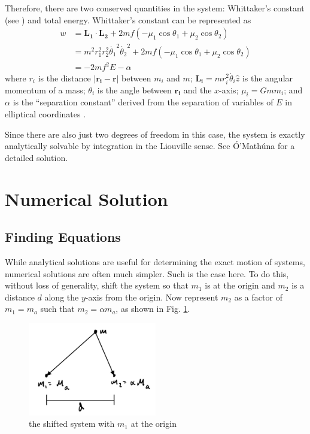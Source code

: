 \documentclass[preprint,titlepage,preprintnumbers,amsmath,amssymb,aps,11pt]{revtex4-2}
\begin{document}
Therefore, there are two conserved quantities in the system: Whittaker's constant (see \cite[p. 100]{Krishnaswami2019}) and total energy. Whittaker's constant can be represented as
\begin{equation}
    \begin{aligned}
        w & =\bm{L_1}\cdot\bm{L_2}+2mf(-\mu _1 \cos{\theta _1} +\mu _2 \cos{\theta _2})                           \\
          & =m^2r_1^2r_2^2\dot{\theta _1}^2\dot{\theta _2}^2+2mf(-\mu _1 \cos{\theta _1} +\mu _2 \cos{\theta _2}) \\
          & =-2mf^2E-\alpha
    \end{aligned}
\end{equation}
where $r_i$ is the distance $|\bm{r_i}-\bm{r}|$ between $m_i$ and $m$; $\bm{L_i}=mr_i^2\dot{\theta _i}\hat{z}$ is the angular momentum of a mass; $\theta _i$ is the angle between $\bm{r_i}$ and the $x$-axis; $\mu _i=Gmm_i$; and $\alpha$ is the “separation constant” derived from the separation of variables of $E$ in elliptical coordinates \cite[p. 101]{Krishnaswami2019}.

Since there are also just two degrees of freedom in this case, the system is exactly analytically solvable by integration in the Liouville sense. See Ó'Mathúna \cite[pages 49-105 and 113-142]{OMathuna2008} for a detailed solution.

\section{Numerical Solution}\label{sec:numerical}

\subsection{Finding Equations}\label{sec:equations}
While analytical solutions are useful for determining the exact motion of systems, numerical solutions are often much simpler. Such is the case here.
To do this, without loss of generality, shift the system so that $m_1$ is at the origin and $m_2$ is a distance $d$ along the $y$-axis from the origin. Now represent $m_2$ as a factor of $m_1=m_a$ such that $m_2=\alpha m_a$, as shown in Fig. \ref{fig:shiftedsys}.
\begin{figure}
    \centering
    \includegraphics[width=0.5\textwidth]{Fig 3.jpeg}
    \caption{the shifted system with $m_1$ at the origin}
    \label{fig:shiftedsys}
\end{figure}
\end{document}
